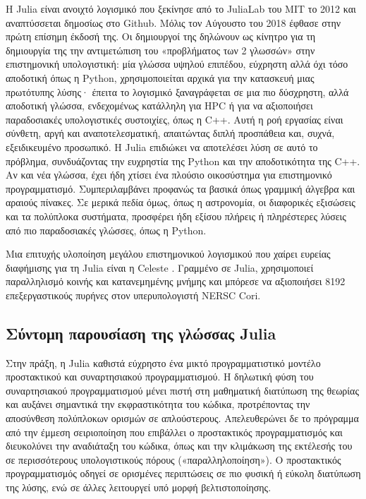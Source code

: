   Η Julia είναι ανοιχτό λογισμικό που ξεκίνησε από το JuliaLab του MIT το 2012 και αναπτύσσεται δημοσίως στο Github.
  Μόλις τον Αύγουστο του 2018 έφθασε στην πρώτη επίσημη έκδοσή της.
  Οι δημιουργοί της δηλώνουν ως κίνητρο για τη δημιουργία της την αντιμετώπιση του «προβλήματος των 2 γλωσσών» στην επιστημονική υπολογιστική:
  μία γλώσσα υψηλού επιπέδου, εύχρηστη αλλά όχι τόσο αποδοτική όπως η Python, χρησιμοποιείται αρχικά για την κατασκευή μιας πρωτότυπης λύσης·
  έπειτα το λογισμικό ξαναγράφεται σε μια πιο δύσχρηστη, αλλά αποδοτική γλώσσα,
  ενδεχομένως κατάλληλη για HPC ή για να αξιοποιήσει παραδοσιακές υπολογιστικές συστοιχίες, όπως η C++.
  Αυτή η ροή εργασίας είναι σύνθετη, αργή και αναποτελεσματική, απαιτώντας διπλή προσπάθεια και, συχνά, εξειδικευμένο προσωπικό.
  Η Julia επιδιώκει να αποτελέσει λύση σε αυτό το πρόβλημα, συνδυάζοντας την ευχρηστία της Python και την αποδοτικότητα της C++.
  Αν και νέα γλώσσα, έχει ήδη χτίσει ένα πλούσιο οικοσύστημα για επιστημονικό προγραμματισμό.
  Συμπεριλαμβάνει προφανώς τα βασικά όπως γραμμική άλγεβρα και αραιούς πίνακες.
  Σε μερικά πεδία όμως, όπως η αστρονομία, οι διαφορικές εξισώσεις και τα πολύπλοκα συστήματα, προσφέρει ήδη εξίσου πλήρεις ή πληρέστερες λύσεις
  από πιο παραδοσιακές γλώσσες, όπως η Python.

  Μια επιτυχής υλοποίηση μεγάλου επιστημονικού λογισμικού που χαίρει ευρείας διαφήμισης για τη Julia είναι η Celeste \cite{regierLearningAstronomicalCatalog2016}.
  Γραμμένο σε Julia, χρησιμοποιεί παραλληλισμό κοινής και κατανεμημένης μνήμης και μπόρεσε να αξιοποιήσει
  8192 επεξεργαστικούς πυρήνες στον υπερυπολογιστή NERSC Cori.

\subsection{Σύντομη παρουσίαση της γλώσσας Julia} \label{intro:julia}

  Στην πράξη, η Julia καθιστά εύχρηστο ένα μικτό προγραμματιστικό μοντέλο προστακτικού και συναρτησιακού προγραμματισμού.
  Η δηλωτική φύση του συναρτησιακού προγραμματισμού μένει πιστή στη μαθηματική διατύπωση της θεωρίας και αυξάνει σημαντικά την εκφραστικότητα του κώδικα,
  προτρέποντας την αποσύνθεση πολύπλοκων ορισμών σε απλούστερους.
  Απελευθερώνει δε το πρόγραμμα από την έμμεση σειριοποίηση που επιβάλλει ο προστακτικός προγραμματισμός και διευκολύνει την αναδιάταξη του κώδικα,
  όπως και την κλιμάκωση της εκτέλεσής του σε περισσότερους υπολογιστικούς πόρους («παραλληλοποίηση»).
  Ο προστακτικός προγραμματισμός οδηγεί σε ορισμένες περιπτώσεις σε πιο φυσική ή εύκολη διατύπωση της λύσης, ενώ σε άλλες λειτουργεί υπό μορφή βελτιστοποίησης.

